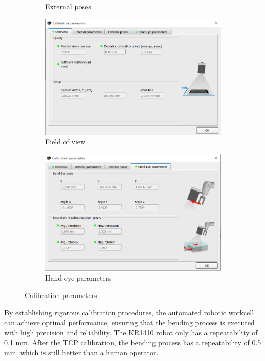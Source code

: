 \begin{figure}[h]
\begin{subfigure}{0.48\textwidth}
        \caption{External poses}
        \label{subfig:external-poses}
    \end{subfigure}
    \begin{subfigure}{0.48\textwidth}
        \centering
        \includegraphics[width=\textwidth]{figures/001calibration/fov.PNG}
        \caption{Field of view}
        \label{subfig:fov}
    \end{subfigure}
    \begin{subfigure}{0.48\textwidth}
        \centering
        \includegraphics[width=\textwidth]{figures/001calibration/hand-eye_parameters.PNG}
        \caption{Hand-eye parameters}
        \label{subfig:hand-eye-parameters}
    \end{subfigure}
    \caption{Calibration parameters}
    \label{fig:calibration-parameters}
\end{figure}


By establishing rigorous calibration procedures, the automated robotic workcell can achieve optimal performance, ensuring that the bending process is executed with high precision and reliability.  The \hyperref[acro:KR]{KR1410} robot only has a repeatability of 0.1 mm. After the \hyperref[acro:TCP]{TCP} calibration, the bending process has a repeatability of 0.5 mm, which is still better than a human operator.
